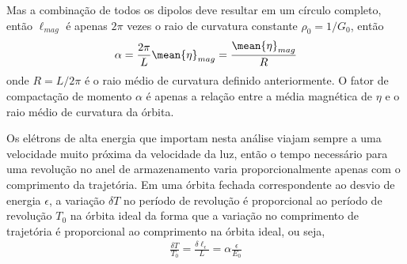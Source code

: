 Mas a combinação de todos os dipolos deve resultar em um círculo completo, então $\ell_{mag}$ é apenas $2\pi$ vezes o raio de curvatura constante $\rho_0 = 1/G_0$, então
\begin{align}
	\alpha = \frac{2\pi}{L}\mean{\eta}_{mag} = \frac{\mean{\eta}_{mag}}{R}\label{eq:3.14}
\end{align}
onde $R=L/2\pi$ é o raio médio de curvatura definido anteriormente. O fator de compactação de momento $\alpha$ é apenas a relação entre a média magnética de $\eta$ e o raio médio de curvatura da órbita.

Os elétrons de alta energia que importam nesta análise viajam sempre a uma velocidade muito próxima da velocidade da luz, então o tempo necessário para uma revolução no anel de armazenamento varia proporcionalmente apenas com o comprimento da trajetória. Em uma órbita fechada correspondente ao desvio de energia $\epsilon$, a variação $\delta T$ no período de revolução é proporcional ao período de revolução $T_0$ na órbita ideal da forma que a variação no comprimento de trajetória é proporcional ao comprimento na órbita ideal, ou seja,
\begin{align}
	\frac{\delta T}{T_0} = \frac{\delta \ell_\epsilon}{L} = \alpha \frac{\epsilon}{E_0}\label{eq:3.15}
\end{align}